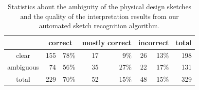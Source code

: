 \begin{table}[t]
\begin{center}
\begin{tabular}{c|rr|rr|rr|r}
           &  \multicolumn{2}{c|}{correct} & \multicolumn{2}{c|}{mostly correct}     & \multicolumn{2}{c|}{incorrect}          & total\\ \hline
clear      & \hspace{0.1in}155 & 78\% \hspace{0.1in} & \hspace{0.1in} 17 &  9\% \hspace{0.1in} & \hspace{0.1in} 26 & 13\% \hspace{0.1in} & 198\\
ambiguous  & \hspace{0.1in} 74 & 56\% \hspace{0.1in} & \hspace{0.1in} 35 & 27\% \hspace{0.1in} & \hspace{0.1in} 22 & 17\% \hspace{0.1in} & 131\\ \hline
total      & \hspace{0.1in}229 & 70\% \hspace{0.1in} & \hspace{0.1in} 52 & 15\% \hspace{0.1in} & \hspace{0.1in} 48 & 15\% \hspace{0.1in} & 329
\end{tabular}
\end{center}
\vspace{-0.1in}
\caption{Statistics about the ambiguity of the physical design sketches and
  the quality of the interpretation results from our automated sketch
  recognition algorithm. }
\label{table:ambiguity_stats}
\end{table}

